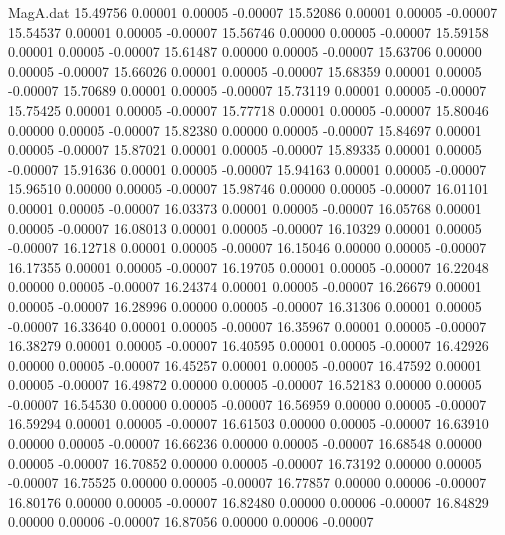 \begin{filecontents}{MagA.dat}
  15.49756    0.00001    0.00005   -0.00007
  15.52086    0.00001    0.00005   -0.00007
  15.54537    0.00001    0.00005   -0.00007
  15.56746    0.00000    0.00005   -0.00007
  15.59158    0.00001    0.00005   -0.00007
  15.61487    0.00000    0.00005   -0.00007
  15.63706    0.00000    0.00005   -0.00007
  15.66026    0.00001    0.00005   -0.00007
  15.68359    0.00001    0.00005   -0.00007
  15.70689    0.00001    0.00005   -0.00007
  15.73119    0.00001    0.00005   -0.00007
  15.75425    0.00001    0.00005   -0.00007
  15.77718    0.00001    0.00005   -0.00007
  15.80046    0.00000    0.00005   -0.00007
  15.82380    0.00000    0.00005   -0.00007
  15.84697    0.00001    0.00005   -0.00007
  15.87021    0.00001    0.00005   -0.00007
  15.89335    0.00001    0.00005   -0.00007
  15.91636    0.00001    0.00005   -0.00007
  15.94163    0.00001    0.00005   -0.00007
  15.96510    0.00000    0.00005   -0.00007
  15.98746    0.00000    0.00005   -0.00007
  16.01101    0.00001    0.00005   -0.00007
  16.03373    0.00001    0.00005   -0.00007
  16.05768    0.00001    0.00005   -0.00007
  16.08013    0.00001    0.00005   -0.00007
  16.10329    0.00001    0.00005   -0.00007
  16.12718    0.00001    0.00005   -0.00007
  16.15046    0.00000    0.00005   -0.00007
  16.17355    0.00001    0.00005   -0.00007
  16.19705    0.00001    0.00005   -0.00007
  16.22048    0.00000    0.00005   -0.00007
  16.24374    0.00001    0.00005   -0.00007
  16.26679    0.00001    0.00005   -0.00007
  16.28996    0.00000    0.00005   -0.00007
  16.31306    0.00001    0.00005   -0.00007
  16.33640    0.00001    0.00005   -0.00007
  16.35967    0.00001    0.00005   -0.00007
  16.38279    0.00001    0.00005   -0.00007
  16.40595    0.00001    0.00005   -0.00007
  16.42926    0.00000    0.00005   -0.00007
  16.45257    0.00001    0.00005   -0.00007
  16.47592    0.00001    0.00005   -0.00007
  16.49872    0.00000    0.00005   -0.00007
  16.52183    0.00000    0.00005   -0.00007
  16.54530    0.00000    0.00005   -0.00007
  16.56959    0.00000    0.00005   -0.00007
  16.59294    0.00001    0.00005   -0.00007
  16.61503    0.00000    0.00005   -0.00007
  16.63910    0.00000    0.00005   -0.00007
  16.66236    0.00000    0.00005   -0.00007
  16.68548    0.00000    0.00005   -0.00007
  16.70852    0.00000    0.00005   -0.00007
  16.73192    0.00000    0.00005   -0.00007
  16.75525    0.00000    0.00005   -0.00007
  16.77857    0.00000    0.00006   -0.00007
  16.80176    0.00000    0.00005   -0.00007
  16.82480    0.00000    0.00006   -0.00007
  16.84829    0.00000    0.00006   -0.00007
  16.87056    0.00000    0.00006   -0.00007

\end{filecontents}
